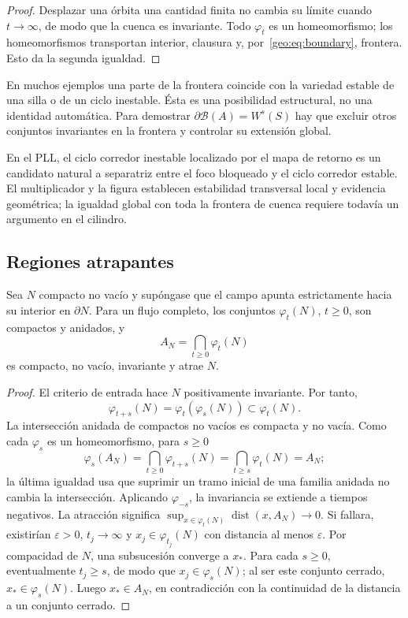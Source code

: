 \begin{proof}
Desplazar una órbita una cantidad finita no cambia su límite cuando
\(t\to\infty\), de modo que la cuenca es invariante. Todo
\(\varphi_t\) es un homeomorfismo; los homeomorfismos transportan interior,
clausura y, por~\eqref{geo:eq:boundary}, frontera. Esto da la segunda igualdad.
\end{proof}



En muchos ejemplos una parte de la frontera coincide con la variedad estable
de una silla o de un ciclo inestable. Ésta es una posibilidad estructural, no
una identidad automática. Para demostrar
\(\partial\mathcal B(A)=W^s(S)\) hay que excluir otros conjuntos invariantes en
la frontera y controlar su extensión global.

En el PLL, el ciclo corredor inestable localizado por el mapa de retorno es un
candidato natural a separatriz entre el foco bloqueado y el ciclo corredor
estable. El multiplicador y la figura establecen estabilidad transversal local
y evidencia geométrica; la igualdad global con toda la frontera de cuenca
requiere todavía un argumento en el cilindro.

\subsection{Regiones atrapantes}

\begin{proposition}
Sea \(N\) compacto no vacío y supóngase que el campo apunta estrictamente hacia su
interior en \(\partial N\). Para un flujo completo, los conjuntos
\(\varphi_t(N)\), \(t\ge0\), son compactos y anidados, y
\begin{equation}
 A_N=\bigcap_{t\ge0}\varphi_t(N)
 \label{geo:eq:maximal-invariant-trapping}
\end{equation}
es compacto, no vacío, invariante y atrae \(N\).
\end{proposition}

\begin{proof}
El criterio de entrada hace \(N\) positivamente invariante. Por tanto,
\[
 \varphi_{t+s}(N)=\varphi_t(\varphi_s(N))\subset\varphi_t(N).
\]
La intersección anidada de compactos no vacíos es compacta y no vacía.
Como cada \(\varphi_s\) es un homeomorfismo, para \(s\ge0\)
\[
 \varphi_s(A_N)=\bigcap_{t\ge0}\varphi_{t+s}(N)
 =\bigcap_{t\ge s}\varphi_t(N)=A_N;
\]
la última igualdad usa que suprimir un tramo inicial de una familia anidada
no cambia la intersección. Aplicando \(\varphi_{-s}\), la invariancia se
extiende a tiempos negativos.
La atracción significa
\(\sup_{x\in\varphi_t(N)}\operatorname{dist}(x,A_N)\to0\).
Si fallara, existirían \(\varepsilon>0\), \(t_j\to\infty\) y
\(x_j\in\varphi_{t_j}(N)\) con distancia al menos \(\varepsilon\).
Por compacidad de \(N\), una subsucesión converge a \(x_*\). Para cada
\(s\ge0\), eventualmente \(t_j\ge s\), de modo que
\(x_j\in\varphi_s(N)\); al ser este conjunto cerrado,
\(x_*\in\varphi_s(N)\). Luego \(x_*\in A_N\), en contradicción con
la continuidad de la distancia a un conjunto cerrado.
\end{proof}


